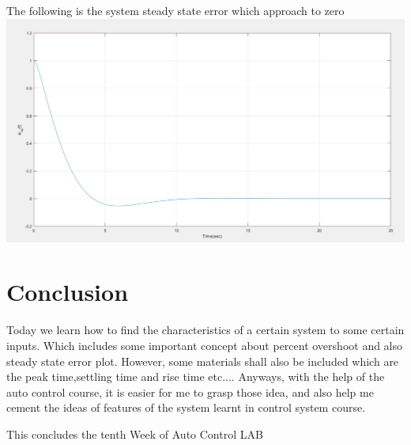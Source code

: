 \documentclass[12pt]{article}
\begin{document}
The following is the system steady state error which approach to zero\\

\includegraphics[scale=0.4]{../Lab8/Pictures/LabProblem2Result_steady_state_error.png} 


\section{Conclusion}
Today we learn how to find the characteristics of a certain system to some certain inputs. Which includes some important concept about percent overshoot and also steady state error plot. However, some materials shall also be included which are the peak time,settling time and rise time etc.... Anyways, with the help of the auto control course, it is easier for me to grasp those idea, and also help me cement the ideas of features of the system learnt in control system course.

\begin{center} 
This concludes the tenth Week of Auto Control LAB\\
\end{center}
\end{document}
